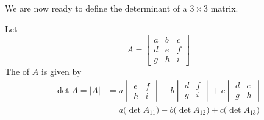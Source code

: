 \documentclass{ximera}
\begin{document}
We are now ready to define the determinant of a $3\times 3$ matrix.
\begin{definition}\label{def:threebythreedet}
Let
$$A=\begin{bmatrix}a&b&c\\d&e&f\\g&h&i\end{bmatrix}$$
The  of $A$ is given by
\begin{align*}\det{A}=|A|&=a\begin{vmatrix}e&f\\h&i\end{vmatrix}-b\begin{vmatrix}d&f\\g&i\end{vmatrix}+c\begin{vmatrix}d&e\\g&h\end{vmatrix}\\
&=a\big(\det{A_{11}}\big)-b\big(\det{A_{12}}\big)+c\big(\det{A_{13}}\big)
\end{align*}
\end{definition}
\end{document}
